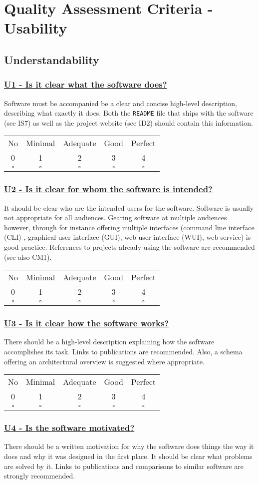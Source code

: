 \documentclass[a4paper,11pt]{article}
\newcommand{\criterion}[2]{\subsubsection*{\underline{#1 - #2}}\label{id:#1}}
\newcommand\CheckTable{%
  \begin{tabular}{ccccc}
    No & Minimal & Adequate & Good & Perfect \\
    0 & 1 & 2 & 3 & 4 \\
    \hline
    $\square$ & $\square$ & $\square$ & $\square$ & $\square$ \\
  \end{tabular}%
}
\begin{document}
\section{Quality Assessment Criteria - Usability}\label{sec:usab}


\subsection{Understandability}\label{sec:und}

\newcommand{\uOneID}{U1}
\newcommand{\uOneText}{Is it clear what the software does?}
\criterion{\uOneID}{\uOneText}

Software must be accompanied be a clear and concise high-level description,
describing what exactly it does. Both the \texttt{README} file that ships with
the software (see IS7) as well as the project website (see ID2) should contain
this information. 

\CheckTable

\newcommand{\uTwoID}{U2}
\newcommand{\uTwoText}{Is it clear for whom the software is intended?}
\criterion{\uTwoID}{\uTwoText}

It should be clear who are the intended users for the software. Software is
usually not appropriate for all audiences. Gearing software at multiple
audiences however, through for instance offering multiple interfaces (command
line interface (CLI) , graphical user interface (GUI), web-user interface
(WUI), web service) is good practice. References to projects already using the
software are recommended (see also CM1).

\CheckTable

\newcommand{\uThreeID}{U3}
\newcommand{\uThreeText}{Is it clear how the software works?}
\criterion{\uThreeID}{\uThreeText}

There should be a high-level description explaining how the software
accomplishes its task. Links to publications are recommended. Also, a schema
offering an architectural overview is suggested where appropriate. 

\CheckTable

\newcommand{\uFourID}{U4}
\newcommand{\uFourText}{Is the software motivated?}
\criterion{\uFourID}{\uFourText}

There should be a written motivation for why the software does things the way
it does and why it was designed in the first place. It should be clear what
problems are solved by it. Links to publications and comparisons to similar
software are strongly recommended.
\end{document}
